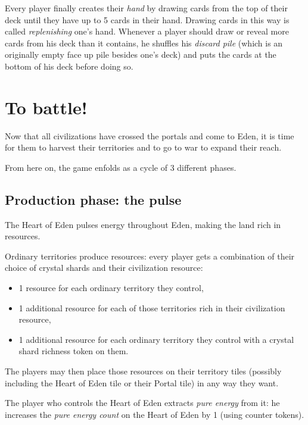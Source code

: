 \documentclass[a4paper]{article}
\begin{document}
        Every player finally creates their \textit{hand} by drawing cards from the top
        of their deck until they have up to 5 cards in their hand.
        Drawing cards in this way is called \textit{replenishing} one's hand.
        Whenever a player should draw or reveal more cards from his deck
        than it contains, he shuffles his \textit{discard pile}
        (which is an originally empty face up pile besides one's deck)
        and puts the cards at the bottom of his deck before doing so.
        
    
\newpage
\section{To battle!}

    Now that all civilizations have crossed the portals and come to Eden,
    it is time for them to harvest their territories and to go to war to expand
    their reach.
    
    From here on, the game enfolds as a cycle of 3 different phases.
    
    \subsection{Production phase: the pulse}
        \label{prod}
        The Heart of Eden pulses energy throughout Eden,
        making the land rich in resources.
        
        Ordinary territories produce resources:
        every player gets a combination of their choice of crystal shards
        and their civilization resource:
        \vspace{-1.3em}
        \begin{itemize}
            \item 1 resource for each ordinary territory they control,
            \item 1 additional resource for each of those territories
                rich in their civilization resource,
            \item 1 additional resource for each ordinary territory they control
                with a crystal shard richness token on them.
        \end{itemize}
        
        The players may then place those resources on their territory tiles
        (possibly including the Heart of Eden tile or their Portal tile)
        in any way they want.
        
        The player who controls the Heart of Eden extracts \textit{pure energy} from it:
        he increases the \textit{pure energy count} on the Heart of Eden by 1
        (using counter tokens).
        
\end{document}
